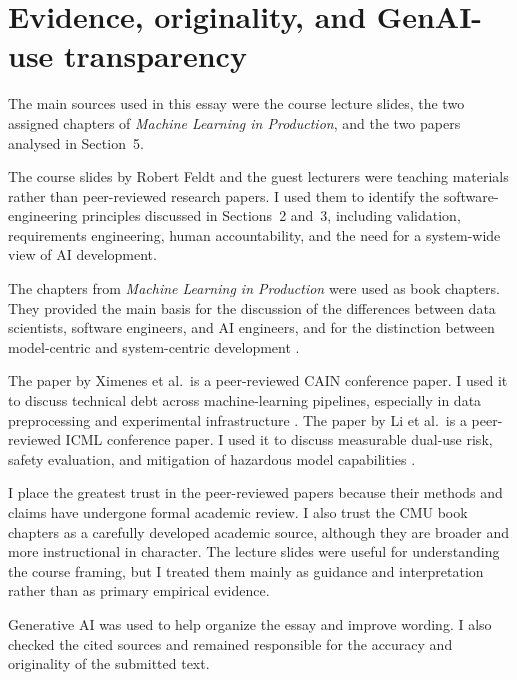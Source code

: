 \documentclass[a4paper,11pt]{article}
\begin{document}
\section{Evidence, originality, and GenAI-use transparency}

The main sources used in this essay were the course lecture slides, the two
assigned chapters of \textit{Machine Learning in Production}, and the two papers
analysed in Section~5.

The course slides by Robert Feldt and the guest lecturers were teaching
materials rather than peer-reviewed research papers. I used them to identify
the software-engineering principles discussed in Sections~2 and~3, including
validation, requirements engineering, human accountability, and the need for a
system-wide view of AI development.

The chapters from \textit{Machine Learning in Production} were used as book
chapters. They provided the main basis for the discussion of the differences
between data scientists, software engineers, and AI engineers, and for the
distinction between model-centric and system-centric development
\cite{kastner2025mlip}.

The paper by Ximenes et al.\ is a peer-reviewed CAIN conference paper. I used it to discuss technical debt across machine-learning pipelines, especially in data preprocessing and experimental infrastructure \cite{ximenes2025technicaldebt}. The paper by Li et al.\ is a peer-reviewed ICML conference paper. I used it to discuss measurable dual-use risk, safety evaluation, and mitigation of hazardous model capabilities \cite{li2024wmdp}.

I place the greatest trust in the peer-reviewed papers because their methods and claims have undergone formal academic review. I also trust the CMU book chapters as a carefully developed academic source, although they are broader and more instructional in character. The lecture slides were useful for understanding the course framing, but I treated them mainly as guidance and interpretation rather than as primary empirical evidence.

Generative AI was used to help organize the essay and improve wording. I also checked the cited sources and remained responsible for the accuracy and originality of the submitted text.
\newpage


\end{document}
